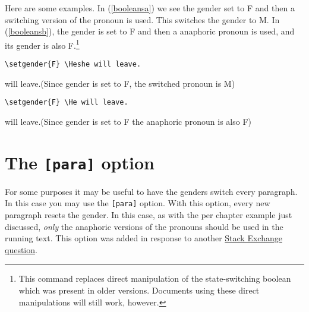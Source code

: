 \documentclass[11pt]{article}
\newcommand*{\pkg}[1]{\texttt{#1}\xspace}
\begin{document}
Here are some examples.  In (\ref{booleansa}) we see the gender set to F and then a switching version of the pronoun is used. This switches the gender to M.  In (\ref{booleansb}), the gender is set to F and then a anaphoric pronoun is used, and its gender is also F.\footnote{This command replaces direct manipulation of the state-switching boolean which was present in older versions. Documents using these direct manipulations will still work, however.}


\begin{exe}
\ex\label{booleansa}
\begin{xlist}
\ex \begin{lstlisting}
\setgender{F} \Heshe will leave.
\end{lstlisting}
\ex {}\Heshe will leave.\hfill(Since gender is set to F, the switched pronoun is M)
\end{xlist}
\end{exe}
\begin{exe}
\ex\label{booleansb}
\begin{xlist}
\ex\begin{lstlisting}
\setgender{F} \He will leave.
\end{lstlisting}
\ex {} \He will leave.\hfill(Since gender is set to F the anaphoric pronoun is also F)
\end{xlist}
\end{exe}


\section{The \pkg{[para]} option}
For some purposes it may be useful to have the genders switch every paragraph.  In this case you may use the \pkg{[para]} option.  With this option, every new paragraph resets the gender.  In this case, as with the per chapter example just discussed, \emph{only} the anaphoric versions of the pronouns should be used in the running text. This option was added in response to another  \href{http://tex.stackexchange.com/q/100108/2693}{Stack Exchange question}.
\end{document}
